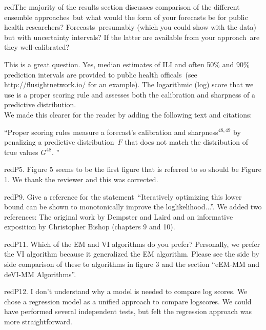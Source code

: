 \documentclass[
  fontsize=11pt,
  paper=a4,
  parskip=half,
  enlargefirstpage=on,    %
  fromalign=right,        %
  fromphone=on,           %
  fromrule=aftername,     %
  addrfield=on,           %
  backaddress=on,         %
  subject=beforeopening,  %
  locfield=narrow,        %
  foldmarks=on,           %
]{scrlttr2}
\begin{document}
    \begin{commt}{red}{The majority of the results section discusses comparison of the different ensemble approaches\, but what would the form of your forecasts be for public health researchers? Forecasts\, presumably (which you could show with the data)\, but with uncertainty intervals? If the latter are available from your approach\, are they well-calibrated?}

      This is a great question.
      Yes, median estimates of ILI and often 50\% and 90\% prediction intervals are provided to public health officals~(see http://flusightnetwork.io/ for an example).
      The logarithmic (log) score that we use is a proper scoring rule and assesses both the calibration and sharpness of a predictive distribution.\\
      
      We made this clearer for the reader by adding the following text and citations:

      ``Proper scoring rules measure a forecast's calibration and sharpness$^{48,49}$ by penalizing a predictive distribution~$F$ that does not match the distribution of true values $G^{48}$. ''
      
    \end{commt}

    \begin{commt}{red}{P5. Figure 5 seems to be the first figure that is referred to so should be Figure 1.}
      We thank the reviewer and this was corrected.
    \end{commt}

    \begin{commt}{red}{P9. Give a reference for the statement\, ``Iteratively optimizing this lower bound can be shown to monotonically improve the loglikelihood...''.}
      We added two references: The original work by Dempster and Laird and an informative exposition by Christopher Bishop (chapters 9 and 10).
    \end{commt}

    \begin{commt}{red}{P11. Which of the EM and VI algorithms do you prefer?}
      Personally, we prefer the VI algorithm because it generalized the EM algorithm.
      Please see the side by side comparison of these to algorithms in figure 3 and the section ``eEM-MM and deVI-MM Algorithms''.
    \end{commt}

    \begin{commt}{red}{P12. I don’t understand why a model is needed to compare log scores.}
      We chose a regression model as a unified approach to compare logscores.
      We could have performed several independent tests, but felt the regression approach was more straightforward.
    \end{commt}


  
\end{document}

